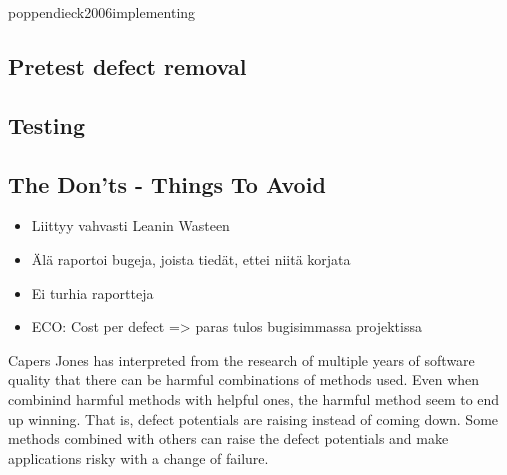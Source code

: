 {poppendieck2006implementing} 

 \subsection{Pretest defect removal}
 
 \subsection{Testing}
 
 \subsection{The Don'ts - Things To Avoid}
 
 \begin{itemize}
 
 \item Liittyy vahvasti Leanin Wasteen
 \item Älä raportoi bugeja, joista tiedät, ettei niitä korjata
 \item Ei turhia raportteja
 \item ECO: Cost per defect => paras tulos bugisimmassa projektissa
 
 \end{itemize}


Capers Jones has interpreted from the research of multiple years of software quality that there can be harmful combinations of methods used. Even when combinind harmful methods with helpful ones, the harmful method seem to end up winning. That is, defect potentials are raising instead of coming down. Some methods combined with others can raise the defect potentials and make applications risky with a change of failure.
